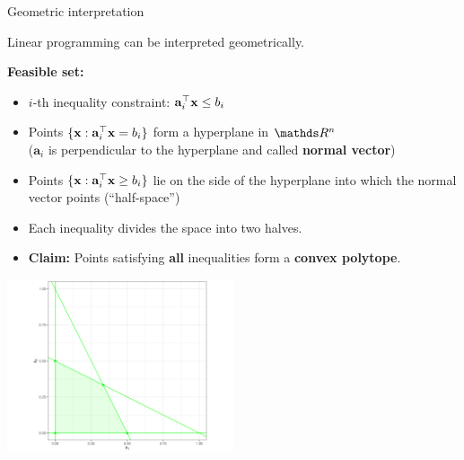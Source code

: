 \documentclass[11pt,compress,t,notes=noshow, xcolor=table]{beamer}
\begin{document}
\begin{vbframe}{Geometric interpretation}

Linear programming can be interpreted geometrically.

\lz

\textbf{Feasible set:}
\begin{itemize}
    \setlength{\itemsep}{1em}
    \item $i$-th inequality constraint: $\mathbf{a}_i^\top \mathbf{x} \le b_i$
    \item Points $\{ \mathbf{x}: \mathbf{a}_i^\top \mathbf{x} = b_i\}$ form a hyperplane in $\R^n$ \\
        ($\mathbf{a}_i$ is perpendicular to the hyperplane and called \textbf{normal vector})
    \item Points $\{\mathbf{x}: \mathbf{a}_i^\top \mathbf{x} \ge b_i\}$ lie on the side of the hyperplane into which the normal vector points (\enquote{half-space})









\framebreak

\item Each inequality divides the space into two halves.
\item \textbf{Claim:} Points satisfying \textbf{all} inequalities form a \textbf{convex polytope}.
\end{itemize}

\begin{center}
    \includegraphics[width=0.5\textwidth]{figure_man/cons-linear-pro-example.png}
\end{center}



\end{vbframe}
\end{document}
